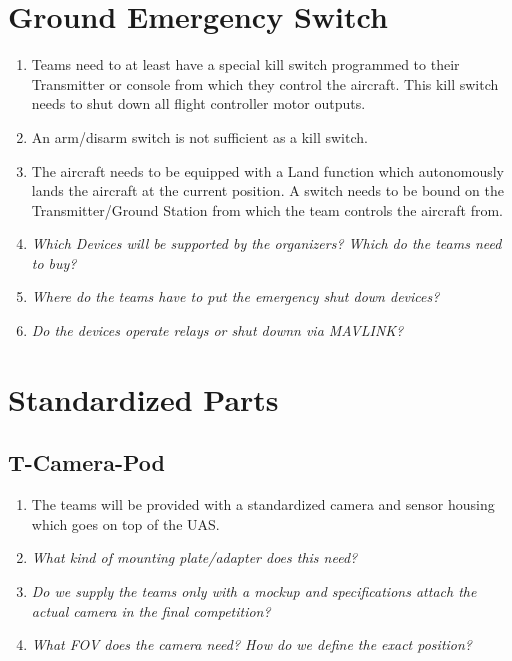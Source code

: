 \documentclass{article}
\begin{document}
\section{Ground Emergency Switch}
\begin{enumerate}
  \item Teams need to at least have a special kill switch programmed to their Transmitter or console from which they control the aircraft. This kill switch needs to shut down all flight controller motor outputs. 
  \item An arm/disarm switch is not sufficient as a kill switch.
  \item The aircraft needs to be equipped with a Land function which autonomously lands the aircraft at the current position. A switch needs to be bound on the Transmitter/Ground Station from which the team controls the aircraft from.  
  \item \emph{Which Devices will be supported by the organizers? Which do the teams need to buy?}
  \item \emph{Where do the teams have to put the emergency shut down devices?}
  \item \emph{Do the devices operate relays or shut downn via MAVLINK?}
\end{enumerate}

\section{Standardized Parts}

\subsection{T-Camera-Pod}
\begin{enumerate}
  \item The teams will be provided with a standardized camera and sensor housing which goes on top of the UAS.
  \item \emph{What kind of mounting plate/adapter does this need?}
  \item \emph{Do we supply the teams only with a mockup and specifications attach the actual camera in the final competition?}
  \item \emph{What FOV does the camera need? How do we define the exact position?}
\end{enumerate}
\end{document}
